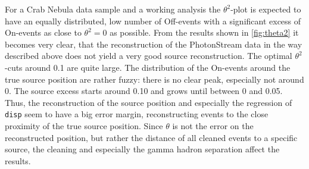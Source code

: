 For a Crab Nebula data sample and a working analysis the $\theta^2$-plot is
expected to have an equally distributed, low number of Off-events with a
significant excess of On-events as close to $\theta^2 = 0$ as possible. From
the results shown in \autoref{fig:theta2} it becomes very clear, that the
reconstruction of the PhotonStream data in the way described above does not
yield a very good source reconstruction. The optimal $\theta^2$-cuts around
\num{0.1} are quite large. The distribution of the On-events around the true
source position are rather fuzzy: there is no clear peak, especially not around
\num{0}. The source excess starts around \num{0.10} and grows until between
\num{0} and \num{0.05}. Thus, the reconstruction of the source position and
especially the regression of \texttt{disp} seem to have a big error margin,
reconstructing events to the close proximity of the true source position. Since
$\theta$ is not the error on the reconstructed position, but rather the
distance of all cleaned events to a specific source, the cleaning and
especially the gamma hadron separation affect the results.
%
